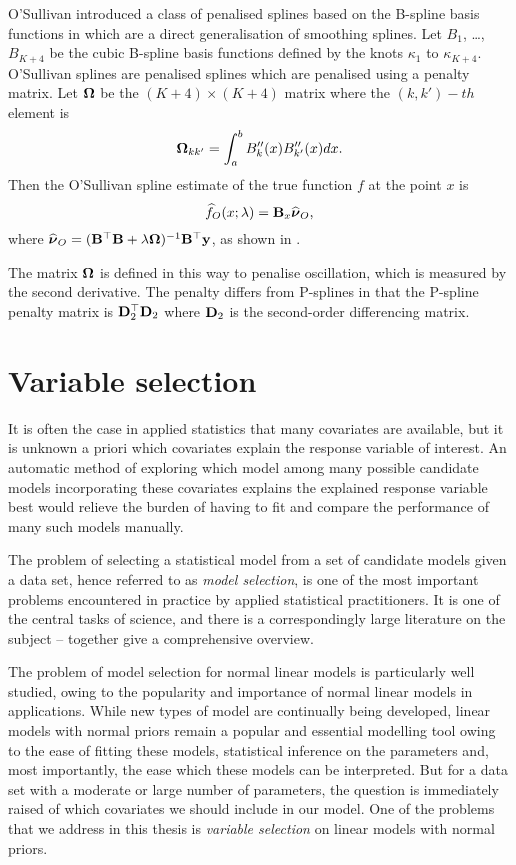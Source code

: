 O'Sullivan introduced a class of penalised splines based on the B-spline basis functions in
\cite{OSullivan1986} which are a direct generalisation of smoothing splines. Let $B_1$, \ldots, $B_{K+4}$ be
the cubic B-spline basis functions defined by the knots $\kappa_1$ to $\kappa_{K+4}$. O'Sullivan splines are
penalised splines which are penalised using a penalty matrix. Let ${\boldsymbol \Omega}$ be the $(K+4) \times (K+4)$ matrix
where the $(k, k')-th$ element is \[   {\boldsymbol \Omega}_{k k'} = \int_a^b B''_k(x) B''_{k'}(x) dx. \] Then the
O'Sullivan spline estimate of the true function $f$ at the point $x$ is
\begin{equation*}
\widehat{f}_O(x; \lambda) = {\bf B}_x \widehat{{\boldsymbol \nu}}_O,
\end{equation*}
where $\widehat{{\boldsymbol \nu}}_O = ({\bf B}^\top {\bf B} + \lambda {\boldsymbol\Omega})^{-1} {\bf B}^\top {\bf y}$, as shown in
\cite{ruppert_wand_carroll_2003}.

The matrix ${\boldsymbol \Omega}$ is defined in this way to penalise oscillation, which is measured by the second
derivative. The penalty differs from P-splines in that the P-spline penalty matrix is ${\bf D}_2^\top {\bf D}_2$ where
${\bf D}_2$ is the second-order differencing matrix.

\section{Variable selection}
It is often the case in applied statistics that many covariates are available, but it is unknown a priori
which covariates explain the response variable of interest. An automatic method of exploring which model among
many possible candidate models incorporating these covariates explains the explained response variable best
would relieve the burden of having to fit and compare the performance of many such models manually.

The problem of selecting a statistical model from a set of candidate models given a data set, hence referred
to as \emph{model selection}, is one of the most important problems encountered in practice by applied
statistical practitioners. It is one of the central tasks of science, and there is a correspondingly large
literature on the subject -- \cite{Claeskens:1251912, NengjunYi2013, Johnstone2009} together give a
comprehensive overview.

The problem of model selection for normal linear models is particularly well studied, owing to the popularity
and importance of normal linear models in applications. While new types of model are continually being
developed, linear models with normal priors remain a popular and essential modelling tool owing to the ease of
fitting these models, statistical inference on the parameters and, most importantly, the ease which
these models can be interpreted. But for a data set with a moderate or large number of parameters, the
question is immediately raised of which covariates we should include in our model. One of the problems that we
address in this thesis is \emph{variable selection} on linear models with normal priors.

